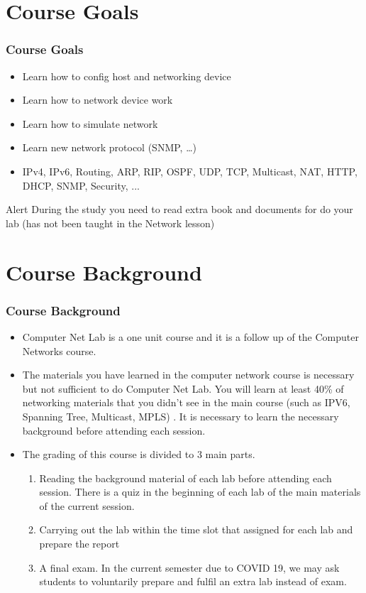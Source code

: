 \documentclass[aspectratio=169,15pt]{beamer}
\begin{document}
\section{Course Goals}
\begin{frame}
    \frametitle{Course Goals}

    \begin{itemize}
        \item Learn how to config host and networking device
        \item Learn how to network device work
        \item Learn how to simulate network
        \item Learn new network protocol (SNMP, \dots)
        \item IPv4, IPv6, Routing, ARP, RIP, OSPF, UDP, TCP, Multicast, NAT, HTTP, DHCP, SNMP, Security, ...         
    \end{itemize}
    \begin{alertblock}{Alert}
        During the study you need to read extra book and documents for do your lab (has not been taught in the Network lesson)
    \end{alertblock}

\end{frame}

\section{Course Background}
\begin{frame}
    \frametitle{Course Background}

    \begin{itemize}
        \item Computer Net Lab is a one unit course and it is a follow up of the Computer Networks course.
        \item The materials you have learned in the computer network course is necessary but not sufficient to do Computer Net Lab.
              You will learn at least 40\% of networking materials that you didn't see in the main course (such as IPV6, Spanning Tree, Multicast, MPLS) . It is necessary to learn the necessary background before attending each session.
        \item The grading of this course is divided to 3 main parts.
        \begin{enumerate}
            \item Reading the background material of each lab before attending each session. There is a quiz in the beginning of each lab of the main materials of the current session.
            \item Carrying out the lab within the time slot that assigned for each lab and prepare the report
            \item A final exam. In the current semester due to COVID 19, we may ask students to voluntarily prepare and fulfil an extra lab instead of exam.
        \end{enumerate}
    \end{itemize}

\end{frame}
\end{document}
